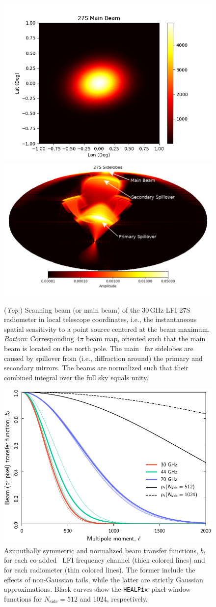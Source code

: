 \documentclass[onecolumn]{aa}
\newcommand{\HEALPix}[0]{\texttt{HEALPix}}
\begin{document}
\begin{figure}[t]
  \center
  \includegraphics[width=0.5\linewidth]{figs/beam_27S_cartesian.png}\\
  \includegraphics[width=0.5\linewidth]{figs/sl_27_S_ps.png}
  \caption{(\emph{Top}:) Scanning beam (or main beam) of the 30\,GHz
    LFI 27S radiometer in local telescope coordinates, i.e., the
    instantaneous spatial sensitivity to a point source
    centered at the beam maximum.  {\emph{Bottom}:} Corresponding
    $4\pi$ beam map, oriented such that the main beam is located on
    the north pole. The main \Planck\ far sidelobes are caused by
    spillover from (i.e., diffraction around) the primary and
    secondary mirrors. The beams are normalized such that their
    combined integral over the full sky equals unity. }
  \label{fig:beam_LFI}
\end{figure}

\begin{figure}[t]
  \center
  \includegraphics[width=0.5\linewidth]{figs/beam_bl.pdf}
  \caption{Azimuthally symmetric and normalized beam transfer
    functions, $b_{\ell}$ for each co-added \Planck\ LFI frequency
    channel (thick colored lines) and for each radiometer (thin
    colored lines). The former include the effects of non-Gaussian
    tails, while the latter are strictly Gaussian
    approximations. Black curves show the \HEALPix\ pixel window
    functions for $N_{\mathrm{side}}=512$ and 1024, respectively.}
  \label{fig:bl_LFI}
\end{figure}
\end{document}
